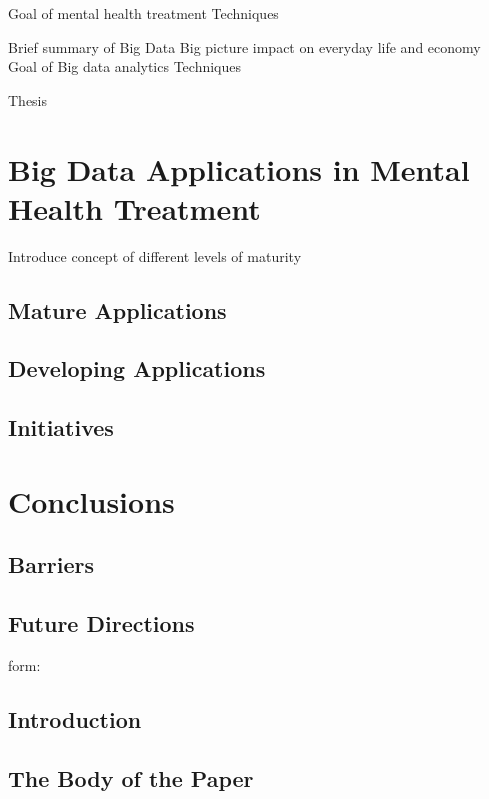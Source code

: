 \documentclass[sigconf]{acmart}
\begin{document}
Goal of mental health treatment
Techniques

Brief summary of Big Data
Big picture impact on everyday life and economy
Goal of Big data analytics
Techniques

Thesis


\section{Big Data Applications in Mental Health Treatment}

Introduce concept of different levels of maturity

\subsection{Mature Applications}



\subsection{Developing Applications}



\subsection{Initiatives}



\section{Conclusions}

\subsection{Barriers}

\subsection{Future Directions}


\appendix

form:

\subsection{Introduction}
\subsection{The Body of the Paper}
\end{document}
